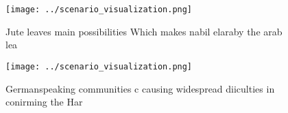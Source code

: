 \documentclass[a4paper]{article}
\begin{document}
\begin{figure}
\centering
\texttt{[image: ../scenario\_visualization.png]}
\caption{Jute leaves main possibilities Which makes nabil elaraby the arab lea
}
\end{figure}
 
\begin{figure}
\centering
\texttt{[image: ../scenario\_visualization.png]}
\caption{Germanspeaking communities c causing widespread diiculties in conirming the Har
}
\end{figure}
 
\end{document}

